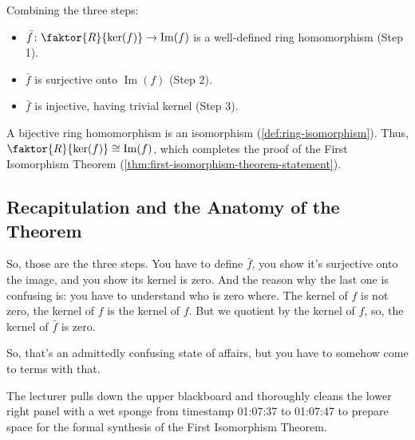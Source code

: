 \begin{proofWrapper}
\begin{content}
\begin{steps}
Combining the three steps:
\begin{itemize}
    \item $\bar{f} \colon \faktor{R}{\ker(f)} \to \operatorname{Im}(f)$ is a well-defined ring homomorphism (Step 1).
    \item $\bar{f}$ is surjective onto $\operatorname{Im}(f)$ (Step 2).
    \item $\bar{f}$ is injective, having trivial kernel (Step 3).
\end{itemize}
A bijective ring homomorphism is an isomorphism (\cref{def:ring-isomorphism}). Thus, $\faktor{R}{\ker(f)} \cong \operatorname{Im}(f)$, which completes the proof of the First Isomorphism Theorem (\cref{thm:first-isomorphism-theorem-statement}).
\end{steps}
\end{content}

\end{proofWrapper}

\subsection{Recapitulation and the Anatomy of the Theorem}

\begin{speech}[01:06:43 - 01:07:37]
So, those are the three steps. You have to define $\bar{f}$, you show it's surjective onto the image, and you show its kernel is zero. And the reason why the last one is confusing is: you have to understand who is zero where. The kernel of $f$ is not zero, the kernel of $f$ is the kernel of $f$. But we quotient by the kernel of $f$, so, the kernel of $\bar{f}$ is zero. 

So, that's an admittedly confusing state of affairs, but you have to somehow come to terms with that.
\end{speech}

\begin{note}
The lecturer pulls down the upper blackboard and thoroughly cleans the lower right panel with a wet sponge from timestamp 01:07:37 to 01:07:47 to prepare space for the formal synthesis of the First Isomorphism Theorem.
\end{note}

